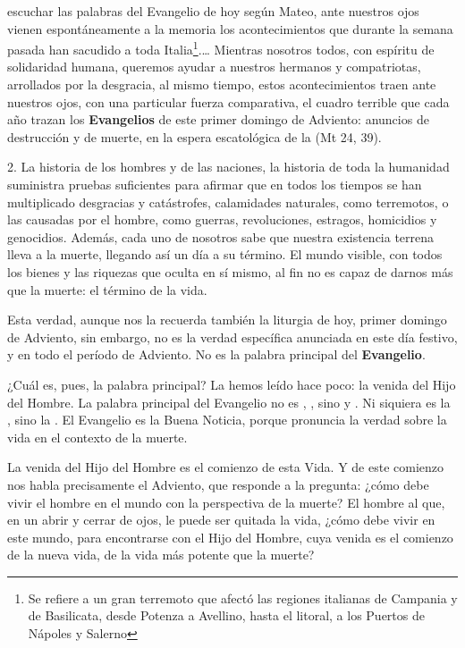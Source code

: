 \begin{body}
	
	
	 escuchar las palabras del Evangelio de hoy según Mateo, ante nuestros ojos vienen espontáneamente a la memoria los acontecimientos que durante la semana pasada han sacudido a toda Italia\footnote{Se refiere a un gran terremoto que afectó las regiones italianas de Campania y de Basilicata, desde Potenza a Avellino, hasta el litoral, a los Puertos de Nápoles y Salerno}.\ldots{} Mientras nosotros todos, con espíritu de solidaridad humana, queremos ayudar a nuestros hermanos y compatriotas, arrollados por la desgracia, al mismo tiempo, estos acontecimientos traen ante nuestros ojos, con una particular fuerza comparativa, el cuadro terrible que cada año trazan los \textbf{Evangelios} de este primer domingo de Adviento: anuncios de destrucción y de muerte, en la espera escatológica de la  (Mt 24, 39). 
	
	2. La historia de los hombres y de las naciones, la historia de toda la humanidad suministra pruebas suficientes para afirmar que en todos los tiempos se han multiplicado desgracias y catástrofes, calamidades naturales, como terremotos, o las causadas por el hombre, como guerras, revoluciones, estragos, homicidios y genocidios. Además, cada uno de nosotros sabe que nuestra existencia terrena lleva a la muerte, llegando así un día a su término. El mundo visible, con todos los bienes y las riquezas que oculta en sí mismo, al fin no es capaz de darnos más que la muerte: el término de la vida. 
	
	Esta verdad, aunque nos la recuerda también la liturgia de hoy, primer domingo de Adviento, sin embargo, no es la verdad específica anunciada en este día festivo, y en todo el período de Adviento. No es la palabra principal del \textbf{Evangelio}. 
	
	¿Cuál es, pues, la palabra principal? La hemos leído hace poco: la venida del Hijo del Hombre. La palabra principal del Evangelio no es , , sino  y . Ni siquiera es la , sino la . El Evangelio es la Buena Noticia, porque pronuncia la verdad sobre la vida en el contexto de la muerte. 
	
	La venida del Hijo del Hombre es el comienzo de esta Vida. Y de este comienzo nos habla precisamente el Adviento, que responde a la pregunta: ¿cómo debe vivir el hombre en el mundo con la perspectiva de la muerte? El hombre al que, en un abrir y cerrar de ojos, le puede ser quitada la vida, ¿cómo debe vivir en este mundo, para encontrarse con el Hijo del Hombre, cuya venida es el comienzo de la nueva vida, de la vida más potente que la muerte? 
	

\end{body}
